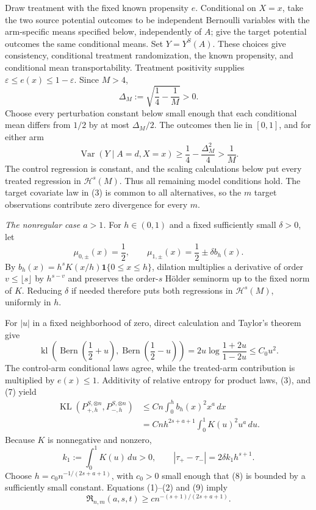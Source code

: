 Draw treatment with the fixed known propensity \(e\). Conditional on \(X=x\), take the two source potential outcomes to be independent Bernoulli variables with the arm-specific means specified below, independently of \(A\); give the target potential outcomes the same conditional means. Set \(Y=Y^S(A)\). These choices give consistency, conditional treatment randomization, the known propensity, and conditional mean transportability. Treatment positivity supplies \(\varepsilon\le e(x)\le1-\varepsilon\). Since \(M>4\),
\[
 \Delta_M:=\sqrt{\frac14-\frac1M}>0.
\]
Choose every perturbation constant below small enough that each conditional mean differs from \(1/2\) by at most \(\Delta_M/2\). The outcomes then lie in \([0,1]\), and for either arm
\[
 \operatorname{Var}(Y\mid A=d,X=x)
 \ge \frac14-\frac{\Delta_M^2}{4}
 >\frac1M.
\tag{5}
\]
The control regression is constant, and the scaling calculations below put every treated regression in \(\mathcal H^s(M)\). Thus all remaining model conditions hold. The target covariate law in (3) is common to all alternatives, so the \(m\) target observations contribute zero divergence for every \(m\).

\emph{The nonregular case \(a>1\).}
For \(h\in(0,1)\) and a fixed sufficiently small \(\delta>0\), let
\[
 \mu_{0,\pm}(x)=\frac12,
 \qquad
 \mu_{1,\pm}(x)=\frac12\pm\delta b_h(x).
\tag{6}
\]
By \(b_h(x)=h^sK(x/h)\mathbf 1\{0\le x\le h\}\), dilation multiplies a derivative of order \(v\le\lfloor s\rfloor\) by \(h^{s-v}\) and preserves the order-\(s\) H\"older seminorm up to the fixed norm of \(K\). Reducing \(\delta\) if needed therefore puts both regressions in \(\mathcal H^s(M)\), uniformly in \(h\).

For \(|u|\) in a fixed neighborhood of zero, direct calculation and Taylor's theorem give
\[
 \operatorname{kl}\!\left(
  \operatorname{Bern}\left(\frac12+u\right),
  \operatorname{Bern}\left(\frac12-u\right)
 \right)
 =2u\log\frac{1+2u}{1-2u}
 \le C_0u^2.
\tag{7}
\]
The control-arm conditional laws agree, while the treated-arm contribution is multiplied by \(e(x)\le1\). Additivity of relative entropy for product laws, (3), and (7) yield
\[
 \begin{aligned}
 \operatorname{KL}(P_{+,h}^{S,\otimes n},P_{-,h}^{S,\otimes n})
 &\le Cn\int_0^h b_h(x)^2x^a\,dx\\
 &=Cnh^{2s+a+1}\int_0^1K(u)^2u^a\,du.
 \end{aligned}
\tag{8}
\]
Because \(K\) is nonnegative and nonzero,
\[
 k_1:=\int_0^1K(u)\,du>0,
 \qquad
 |\tau_+-\tau_-|=2\delta k_1h^{s+1}.
\tag{9}
\]
Choose \(h=c_0n^{-1/(2s+a+1)}\), with \(c_0>0\) small enough that (8) is bounded by a sufficiently small constant. Equations (1)--(2) and (9) imply
\[
 \mathfrak R_{n,m}(a,s,t)
 \ge c n^{-(s+1)/(2s+a+1)}.
\tag{10}
\]

